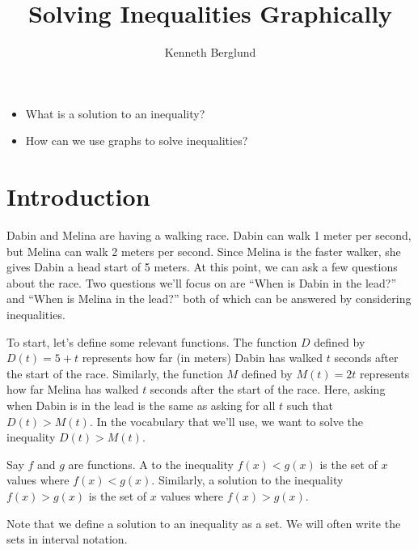 \documentclass[noauthor, nooutcomes]{ximera}
\author{Kenneth Berglund}
\title{Solving Inequalities Graphically}
\begin{document}
\begin{abstract}
  
\end{abstract}
\maketitle
\licenseSZ

\begin{motivatingQuestions}\begin{itemize}
	\item What is a solution to an inequality?
	\item How can we use graphs to solve inequalities?
\end{itemize}\end{motivatingQuestions}

\section{Introduction}
Dabin and Melina are having a walking race. Dabin can walk 1 meter per second, but Melina can walk 2 meters per second. Since Melina is the faster walker, she gives Dabin a head start of 5 meters. At this point, we can ask a few questions about the race. Two questions we'll focus on are ``When is Dabin in the lead?'' and  ``When is Melina in the lead?'' both of which can be answered by considering inequalities. 

To start, let's define some relevant functions. The function $D$ defined by $D(t) = 5 + t$ represents how far (in meters) Dabin has walked $t$ seconds after the start of the race. Similarly, the function $M$ defined by $M(t) = 2t$ represents how far Melina has walked $t$ seconds after the start of the race. Here, asking when Dabin is in the lead is the same as asking for all $t$ such that $D(t) > M(t)$. In the vocabulary that we'll use, we want to solve the inequality $D(t) > M(t)$. 

\begin{definition}
Say $f$ and $g$ are functions. A  to the inequality $f(x) < g(x)$ is the set of $x$ values where $f(x) < g(x)$. Similarly, a solution to the inequality $f(x) > g(x)$ is the set of $x$ values where $f(x) > g(x)$.
\end{definition}

Note that we define a solution to an inequality as a set. We will often write the sets in interval notation. 
\end{document}
